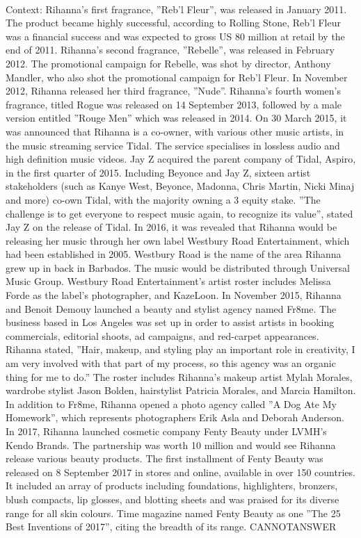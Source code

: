 \documentclass[11pt,a4paper, onecolumn]{article}
\begin{document}
\\ Context: Rihanna's first fragrance, ''Reb'l Fleur'', was released in January 2011. The product became highly successful, according to Rolling Stone, Reb'l Fleur was a financial success and was expected to gross US 80 million at retail by the end of 2011. Rihanna's second fragrance, ''Rebelle'', was released in February 2012. The promotional campaign for Rebelle, was shot by director, Anthony Mandler, who also shot the promotional campaign for Reb'l Fleur. In November 2012, Rihanna released her third fragrance, ''Nude''. Rihanna's fourth women's fragrance, titled Rogue was released on 14 September 2013, followed by a male version entitled ''Rouge Men'' which was released in 2014. On 30 March 2015, it was announced that Rihanna is a co-owner, with various other music artists, in the music streaming service Tidal. The service specialises in lossless audio and high definition music videos. Jay Z acquired the parent company of Tidal, Aspiro, in the first quarter of 2015. Including Beyonce and Jay Z, sixteen artist stakeholders (such as Kanye West, Beyonce, Madonna, Chris Martin, Nicki Minaj and more) co-own Tidal, with the majority owning a 3  equity stake. ''The challenge is to get everyone to respect music again, to recognize its value'', stated Jay Z on the release of Tidal. In 2016, it was revealed that Rihanna would be releasing her music through her own label Westbury Road Entertainment, which had been established in 2005. Westbury Road is the name of the area Rihanna grew up in back in Barbados. The music would be distributed through Universal Music Group. Westbury Road Entertainment's artist roster includes Melissa Forde as the label's photographer, and KazeLoon. In November 2015, Rihanna and Benoit Demouy launched a beauty and stylist agency named Fr8me. The business based in Los Angeles was set up in order to assist artists in booking commercials, editorial shoots, ad campaigns, and red-carpet appearances. Rihanna stated, ''Hair, makeup, and styling play an important role in creativity, I am very involved with that part of my process, so this agency was an organic thing for me to do.'' The roster includes Rihanna's makeup artist Mylah Morales, wardrobe stylist Jason Bolden, hairstylist Patricia Morales, and Marcia Hamilton. In addition to Fr8me, Rihanna opened a photo agency called ''A Dog Ate My Homework'', which represents photographers Erik Asla and Deborah Anderson. In 2017, Rihanna launched cosmetic company Fenty Beauty under LVMH's Kendo Brands. The partnership was worth  10 million and would see Rihanna release various beauty products. The first installment of Fenty Beauty was released on 8 September 2017 in stores and online, available in over 150 countries. It included an array of products including foundations, highlighters, bronzers, blush compacts, lip glosses, and blotting sheets and was praised for its diverse range for all skin colours. Time magazine named Fenty Beauty as one ''The 25 Best Inventions of 2017'', citing the breadth of its range. CANNOTANSWER
\end{document}

